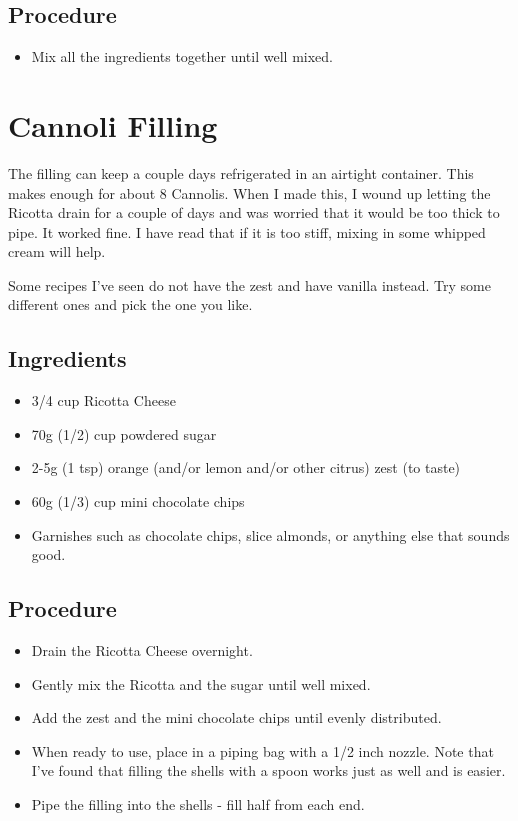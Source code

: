 \documentclass[10pt, openany]{book}
\begin{document}
\subsection{Procedure}
\begin{itemize}
  \item Mix all the ingredients together until well mixed.
\end{itemize}

\section{Cannoli Filling}
\label{extra:CannoliFilling}
The filling can keep a couple days refrigerated in an airtight container.  This makes enough for about 8 Cannolis.  When I made this, I wound up letting the Ricotta drain for a couple of days and was worried that it would be too thick to pipe.  It worked fine.  I have read that if it is too stiff, mixing in some whipped cream will help.

Some recipes I've seen do not have the zest and have vanilla instead.  Try some different ones and pick the one you like.
\subsection{Ingredients}
\begin{itemize}
  \item 3/4 cup Ricotta Cheese
  \item 70g (1/2) cup powdered sugar
  \item 2-5g (1 tsp) orange (and/or lemon and/or other citrus) zest (to taste)
  \item 60g (1/3) cup mini chocolate chips
  \item Garnishes such as chocolate chips, slice almonds, or anything else that sounds good.
\end{itemize}
\subsection{Procedure}
\begin{itemize}
  \item Drain the Ricotta Cheese overnight.
  \item Gently mix the Ricotta and the sugar until well mixed.
  \item Add the zest and the mini chocolate chips until evenly distributed.
  \item When ready to use, place in a piping bag with a 1/2 inch nozzle.  Note that I've found that filling the shells with a spoon works just as well and is easier.
  \item Pipe the filling into the shells - fill half from each end.
\end{itemize}
\end{document}
